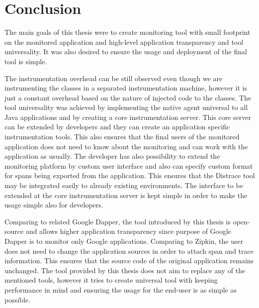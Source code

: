 \chapter{Conclusion}
The main goals of this thesis were to create monitoring tool with small footprint on the monitored application and high-level application transparency and tool universality. It was also desired to ensure the usage and deployment of the final tool is simple. 

The instrumentation overhead can be still observed even though we are instrumenting the classes in a separated instrumentation machine, however it is just a constant overhead based on the nature of injected code to the classes. The tool universality was achieved by implementing the native agent universal to all Java applications and by creating a core instrumentation server. This core server can be extended by developers and they can create an application specific instrumentation tools. This also ensures that the final users of the monitored application does not need to know about the monitoring and can work with the application as usually. The developer has also possibility to extend the monitoring platform by custom user interface and also can specify custom format for spans being exported from the application. This ensures that the Distrace tool may be integrated easily to already existing environments. The interface to be extended at the core instrumentation server is kept simple in order to make the usage simple also for developers.

Comparing to related Google Dapper, the tool introduced by this thesis is open-source and allows higher application transparency since purpose of Google Dapper is to monitor only Google applications. Comparing to Zipkin, the user does not need to change the application sources in order to attach span and trace information. This ensures that the source code of the original application remains unchanged. The tool provided by this thesis does not aim to replace any of the mentioned tools, however it tries to create universal tool with keeping performance in mind and ensuring the usage for the end-user is as simple as possible.

